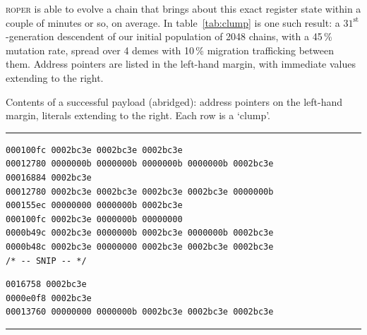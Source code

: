 \textsc{roper} is able to evolve a chain that brings about this
exact register state within a couple of minutes or so, on
average. In table~\ref{tab:clump} is one such result: a
$31^{\textrm{st}}$-generation descendent of our initial
population of 2048 chains, with a 45\,\% mutation rate, spread over
4 demes with 10\,\% migration trafficking between them. Address
pointers are listed in the left-hand margin, with immediate
values extending to the right. 
\begin{table}
\caption{Contents of a successful payload (abridged): address pointers on
the left-hand margin, literals extending to the right. Each row
is a `clump'.}
\label{tab:clump}
  \hrule
  {\tiny
\begin{verbatim}
000100fc 0002bc3e 0002bc3e 0002bc3e 
00012780 0000000b 0000000b 0000000b 0000000b 0002bc3e 
00016884 0002bc3e 
00012780 0002bc3e 0002bc3e 0002bc3e 0002bc3e 0000000b 
000155ec 00000000 0000000b 0002bc3e 
000100fc 0002bc3e 0000000b 00000000 
0000b49c 0002bc3e 0000000b 0002bc3e 0000000b 0002bc3e 
0000b48c 0002bc3e 00000000 0002bc3e 0002bc3e 0002bc3e 
/* -- SNIP -- */
\end{verbatim}

\begin{verbatim}
0016758 0002bc3e 
0000e0f8 0002bc3e 
00013760 00000000 0000000b 0002bc3e 0002bc3e 0002bc3e 
\end{verbatim}
  }
\hrule
\end{table}

